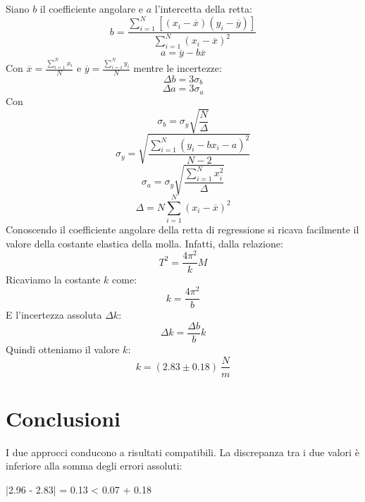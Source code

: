 \documentclass[11pt]{article}
\begin{document}
Siano $b$ il coefficiente angolare e $a$ l'intercetta della retta:
\begin{equation}
    b=\frac{\displaystyle\sum_{i=1}^{N}[(x_i-\overline{x})(y_i-\overline{y})]}{\displaystyle\sum_{i=1}^{N}(x_i-\overline{x})^2}
\end{equation}
\begin{equation}
    a=\overline{y}-b\overline{x}
\end{equation}
Con $\overline{x}=\frac{\displaystyle\sum_{i=1}^{N}x_i}{N}$ e $\overline{y}=\frac{\displaystyle\sum_{i=1}^{N}y_i}{N}$
mentre le incertezze:
\begin{equation}
    \Delta b=3\sigma_b
\end{equation}
\begin{equation}
    \Delta a=3\sigma_a
\end{equation}
Con
\begin{equation}
    \sigma_b=\sigma_y\sqrt{\frac{N}{\Delta}}
\end{equation}
\begin{equation}
    \sigma_y=\sqrt{\frac{\displaystyle\sum_{i=1}^{N}(y_i-bx_i-a)^2}{N-2}}
\end{equation}
\begin{equation}
    \sigma_a=\sigma_y\sqrt{\frac{\displaystyle\sum_{i=1}^{N}x_i^2}{\Delta}}
\end{equation}
\begin{equation}
    \Delta=N\displaystyle\sum_{i=1}^{N}(x_i-\overline{x})^2
\end{equation}
Conoscendo il coefficiente angolare della retta di regressione si ricava facilmente il valore della costante elastica della molla. Infatti, dalla relazione:
\begin{equation}
    T^2=\frac{4\pi^2}{k}M
\end{equation}
Ricaviamo la costante $k$ come:
\begin{equation}
    k=\frac{4\pi^2}{b}
\end{equation}
E l'incertezza assoluta $\Delta k$:
\begin{equation}
    \Delta k=\frac{\Delta b}{b}k
\end{equation}
Quindi otteniamo il valore $k$:
\begin{equation}
    k = (2.83 \pm 0.18)\ \frac{N}{m} 
\end{equation}

\section{Conclusioni }
I due approcci conducono a risultati compatibili. La discrepanza tra i due valori è inferiore alla somma degli errori assoluti:
\begin{center}
    |2.96 - 2.83| = 0.13 < 0.07 + 0.18
\end{center}
\end{document}
